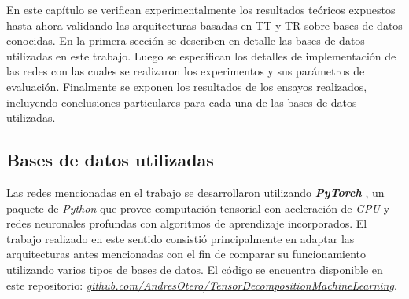 \documentclass[spanish]{article}
\theoremstyle{definition}
\theoremstyle{remark}
\numberwithin{equation}{section}
\numberwithin{equation}{section} %
\begin{document}
\vspace*{0.25in}
\begin{center}
\end{center}
\vspace*{0.25in}
\normalsize En este capítulo se verifican experimentalmente los resultados teóricos expuestos hasta ahora validando las arquitecturas basadas en TT y TR sobre bases de datos conocidas. En la primera sección se describen en detalle las bases de datos utilizadas en este trabajo. Luego se especifican los detalles de implementación de las redes con las cuales se realizaron los experimentos y sus parámetros de evaluación. Finalmente se exponen los resultados de los ensayos realizados, incluyendo conclusiones particulares para cada una de las bases de datos utilizadas.




\clearpage
\subsection{Bases de datos utilizadas}
\label{ssec:implementation}
Las redes mencionadas en el trabajo se desarrollaron utilizando \textit{\textbf{PyTorch}} \cite{paszke2017automatic}, un paquete de \textit{Python} que provee computación tensorial con aceleración de \textit{GPU} y redes neuronales profundas con algoritmos de aprendizaje incorporados. El trabajo realizado en este sentido consistió principalmente en adaptar las arquitecturas antes mencionadas con el fin de comparar su funcionamiento utilizando varios tipos de bases de datos. El código se encuentra disponible en este repositorio: \textit{\hyperlink{https://github.com/AndresOtero/TensorDecompositionMachineLearning}{github.com/AndresOtero/TensorDecompositionMachineLearning}}.
\par
\end{document}
